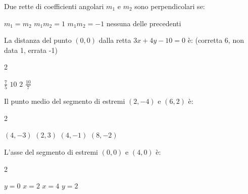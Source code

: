 \documentclass[a4paper,10pt]{exam}
\begin{document}
\begin{questions}
\question Due rette di coefficienti angolari $m_1$ e $m_2$ sono perpendicolari se:
\vspace{0.2em}
\begin{choices}
\choice $m_1=m_2$
\choice $m_1m_2=1$
\choice $m_1m_2=-1$
\choice nessuna delle precedenti
\end{choices}

\question La distanza del punto $(0,0)$ dalla retta $3x+4y-10=0$ è: \hfill{\footnotesize (corretta 6, non data 1, errata -1)}
\vspace{0.2em}
\begin{multicols}{2}
\begin{choices}
\choice $\frac{7}{5}$
\choice $10$
\choice $2$
\choice $\frac{10}{7}$
\end{choices}
\end{multicols}

\question Il punto medio del segmento di estremi $(2,-4)$ e $(6,2)$ è:
\vspace{0.2em}
\begin{multicols}{2}
\begin{choices}
\choice $(4,-3)$
\choice $(2,3)$
\choice $(4,-1)$
\choice $(8,-2)$
\end{choices}
\end{multicols}

\question L'asse del segmento di estremi $(0,0)$ e $(4,0)$ è:
\vspace{0.2em}
\begin{multicols}{2}
\begin{choices}
\choice $y=0$
\choice $x=2$
\choice $x=4$
\choice $y=2$
\end{choices}
\end{multicols}

\end{questions}
\end{document}
